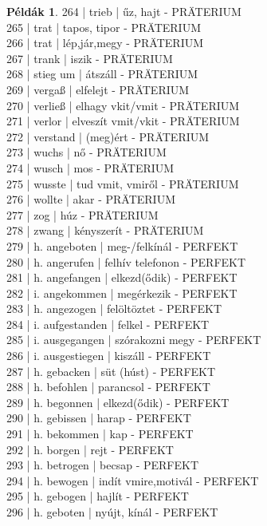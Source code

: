 \documentclass{article}
\theoremstyle{definition}
\newtheorem*{exmp}{Példák}
\begin{document}
\begin{exmp}
264 | trieb | űz, hajt - PRÄTERIUM\\
265 | trat | tapos, tipor - PRÄTERIUM\\
266 | trat | lép,jár,megy - PRÄTERIUM\\
267 | trank | iszik - PRÄTERIUM\\
268 | stieg um | átszáll - PRÄTERIUM\\
269 | vergaß | elfelejt - PRÄTERIUM\\
270 | verließ | elhagy vkit/vmit - PRÄTERIUM\\
271 | verlor | elveszít vmit/vkit - PRÄTERIUM\\
272 | verstand | (meg)ért - PRÄTERIUM\\
273 | wuchs | nő - PRÄTERIUM\\
274 | wusch | mos - PRÄTERIUM\\
275 | wusste | tud vmit, vmiről - PRÄTERIUM\\
276 | wollte | akar - PRÄTERIUM\\
277 | zog | húz - PRÄTERIUM\\
278 | zwang | kényszerít - PRÄTERIUM\\
279 | h. angeboten | meg-/felkínál - PERFEKT\\
280 | h. angerufen | felhív telefonon - PERFEKT\\
281 | h. angefangen | elkezd(ődik) - PERFEKT\\
282 | i. angekommen | megérkezik - PERFEKT\\
283 | h. angezogen | felöltöztet - PERFEKT\\
284 | i. aufgestanden | felkel - PERFEKT\\
285 | i. ausgegangen | szórakozni megy - PERFEKT\\
286 | i. ausgestiegen | kiszáll - PERFEKT\\
287 | h. gebacken | süt (húst) - PERFEKT\\
288 | h. befohlen | parancsol - PERFEKT\\
289 | h. begonnen | elkezd(ődik) - PERFEKT\\
290 | h. gebissen | harap - PERFEKT\\
291 | h. bekommen | kap - PERFEKT\\
292 | h. borgen | rejt - PERFEKT\\
293 | h. betrogen | becsap - PERFEKT\\
294 | h. bewogen | indít vmire,motivál - PERFEKT\\
295 | h. gebogen | hajlít - PERFEKT\\
296 | h. geboten | nyújt, kínál - PERFEKT\\

\end{exmp}
\end{document}
